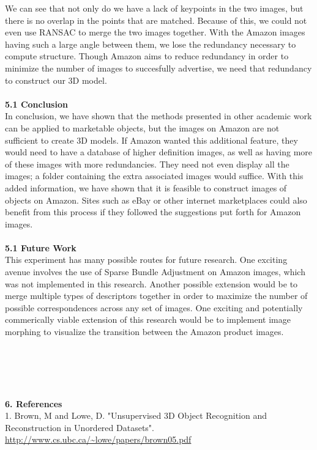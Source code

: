 \documentclass[12pt]{article}
\begin{document}
\begin{multicols}{2}
We can see that not only do we have a lack of keypoints in the two images, but there is no overlap in the points that are matched. Because of this, we could not even use RANSAC to merge the two images together. With the Amazon images having such a large angle between them, we lose the redundancy necessary to compute structure. Though Amazon aims to reduce redundancy in order to minimize the number of images to succesfully advertise, we need that redundancy to construct our 3D model.\\\\
{\large \textbf{5.1 Conclusion}}\\
In conclusion, we have shown that the methods presented in other academic work can be applied to marketable objects, but the images on Amazon are not sufficient to create 3D models. If Amazon wanted this additional feature, they would need to have a database of higher definition images, as well as having more of these images with more redundancies. They need not even display all the images; a folder containing the extra associated images would suffice. With this added information, we have shown that it is feasible to construct images of objects on Amazon. Sites such as eBay or other internet marketplaces could also benefit from this process if they followed the suggestions put forth for Amazon images. \\\\
{\large \textbf{5.1 Future Work}}\\
This experiment has many possible routes for future research. One exciting avenue involves the use of Sparse Bundle Adjustment on Amazon images, which was not implemented in this research. Another possible extension would be to merge multiple types of descriptors together in order to maximize the number of possible correspondences across any set of images. One exciting and potentially commerically viable extension of this research would be to implement image morphing to visualize the transition between the Amazon product images. \\\\\\\\\\\\
{\large \textbf{6. References}}\\
1. Brown, M and Lowe, D. "Unsupervised 3D Object Recognition and Reconstruction in Unordered Datasets". \url{http://www.cs.ubc.ca/~lowe/papers/brown05.pdf}\\\\

\end{multicols}
\end{document}
